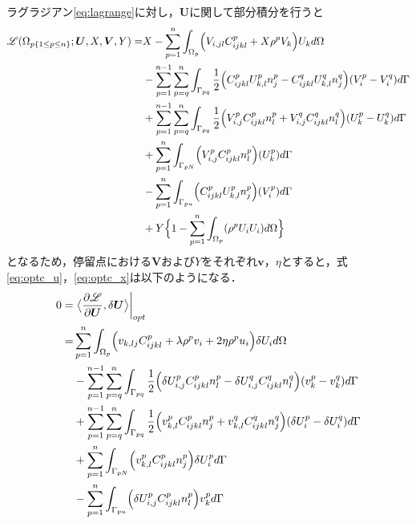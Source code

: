 ラグラジアン\eqref{eq:lagrange}に対し，$\bm{U}$に関して部分積分を行うと
\begin{align}
	\mathscr{L}(\Omega_{p\{1\leq p\leq n\}};\bm{U},X,\bm{V},Y)=&X-\sum_{p=1}^{n}\int_{\Omega_p}\Bigr(V_{i,jl}C_{ijkl}^{p}+X\rho^{p}V_{k}\Bigl)U_{k} d\Omega
	\nonumber
	\\
	&-\sum_{p=1}^{n-1}\sum_{p=q}^{n}\int_{\Gamma_{pq}}\frac{1}{2}\Bigr(C_{ijkl}^{p}U_{k,l}^{p}n_{j}^{p}-C_{ijkl}^{q}U_{k,l}^{q}n_{j}^{q}\Bigl)(V_{i}^{p}-V_{i}^{q}) d\Gamma
	\nonumber
	\\
	&+\sum_{p=1}^{n-1}\sum_{p=q}^{n}\int_{\Gamma_{pq}}\frac{1}{2}\Bigr(V_{i,j}^{p}C_{ijkl}^{p}n_{l}^{p}+V_{i,j}^{q}C_{ijkl}^{q}n_{l}^{q}\Bigl)(U_{k}^{p}-U_{k}^{q})d\Gamma
	\nonumber
	\\
	&+\sum_{p=1}^{n}\int_{\Gamma_{pN}}\Bigr(V_{i,j}^{p}C_{ijkl}^{p}n_{l}^{p}\Bigl)(U_{k}^{p}) d\Gamma
	\nonumber
	\\
	&-\sum_{p=1}^{n}\int_{\Gamma_{pu}}\Bigr(C_{ijkl}^{p}U_{k,l}^{p}n_{j}^{p}\Bigl)(V_{i}^{p}) d\Gamma
	\nonumber
	\\
	&+Y\Bigr\{1- \sum_{p=1}^{n}\int_{\Omega_{p}}(\rho^{p}U_{i}U_{i}) d\Omega \Bigl\}
	\nonumber
	\\
	\label{eq:lagrange_uint}
\end{align}
となるため，停留点における$\bm{V}$および$Y$をそれぞれ$\bm{v}$，$\eta$とすると，式\eqref{eq:optc_u}，\eqref{eq:optc_x}は以下のようになる．
\begin{align}
	0=&\left.\bigr\langle \frac{\partial \mathscr{L}}{\partial \bm{U}},\delta \bm{U} \bigl\rangle\right|_{opt}
	\nonumber
	\\
	=&\sum_{p=1}^{n}\int_{\Omega_p}\Bigr(v_{k,lj}C_{ijkl}^{p}+\lambda\rho^{p}v_{i}+2\eta\rho^{p}u_{i}\Bigl)\delta U_{i} d\Omega
	\nonumber
	\\
	&-\sum_{p=1}^{n-1}\sum_{p=q}^{n}\int_{\Gamma_{pq}}\frac{1}{2}\Bigr(\delta U_{i,j}^{p}C_{ijkl}^{p}n_{l}^{p}-\delta U_{i,j}^{q}C_{ijkl}^{q}n_{l}^{q}\Bigl)(v_{k}^{p}-v_{k}^{q}) d\Gamma
	\nonumber
	\\
	&+\sum_{p=1}^{n-1}\sum_{p=q}^{n}\int_{\Gamma_{pq}}\frac{1}{2}\Bigr(v_{k,l}^{p}C_{ijkl}^{p}n_{j}^{p}+v_{k,l}^{q}C_{ijkl}^{q}n_{j}^{q}\Bigl)(\delta U_{i}^{p}-\delta U_{i}^{q})d\Gamma
	\nonumber
	\\
	&+\sum_{p=1}^{n}\int_{\Gamma_{pN}}\Bigr(v_{k,l}^{p}C_{ijkl}^{p}n_{j}^{p}\Bigl)\delta U_{i}^{p} d\Gamma
	\nonumber
	\\
	&-\sum_{p=1}^{n}\int_{\Gamma_{pu}}\Bigr(\delta U_{i,j}^{p}C_{ijkl}^{p}n_{l}^{p}\Bigl)v_{k}^{p} d\Gamma
	\label{eq:lagrange_uderivative}
\end{align}
